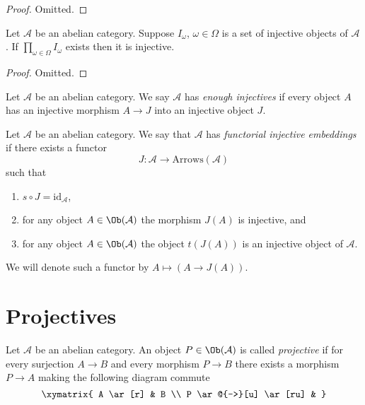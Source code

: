 \begin{proof}
Omitted.
\end{proof}

\begin{lemma}
\label{lemma-product-injectives}
Let $\mathcal{A}$ be an abelian category.
Suppose $I_\omega$, $\omega \in \Omega$ is a set of injective
objects of $\mathcal{A}$. If $\prod_{\omega \in \Omega} I_\omega$
exists then it is injective.
\end{lemma}

\begin{proof}
Omitted.
\end{proof}

\begin{definition}
\label{definition-enough-injectives}
Let $\mathcal{A}$ be an abelian category.
We say $\mathcal{A}$ has {\it enough injectives}
if every object $A$ has an injective morphism
$A \to J$ into an injective object $J$.
\end{definition}

\begin{definition}
\label{definition-functorial-injective-embedding}
Let $\mathcal{A}$ be an abelian category.
We say that $\mathcal{A}$ has {\it functorial injective embeddings}
if there exists a functor
$$
J : \mathcal{A} \longrightarrow \text{Arrows}(\mathcal{A})
$$
such that
\begin{enumerate}
\item $s \circ J = \text{id}_\mathcal{A}$,
\item for any object $A \in \Ob(\mathcal{A})$
the morphism $J(A)$ is injective, and
\item for any object $A \in \Ob(\mathcal{A})$
the object $t(J(A))$ is an injective object of $\mathcal{A}$.
\end{enumerate}
We will denote such a functor by
$A \mapsto (A \to J(A))$.
\end{definition}





\section{Projectives}
\label{section-projectives}

\begin{definition}
\label{definition-projective}
Let $\mathcal{A}$ be an abelian category.
An object $P \in \Ob(\mathcal{A})$ is
called {\it projective} if for every surjection
$A \rightarrow B$ and every morphism
$P \to B$ there exists a morphism $P \to A$ making
the following diagram commute
$$
\xymatrix{
A \ar[r] & B \\
P \ar@{-->}[u] \ar[ru] &
}
$$
\end{definition}

